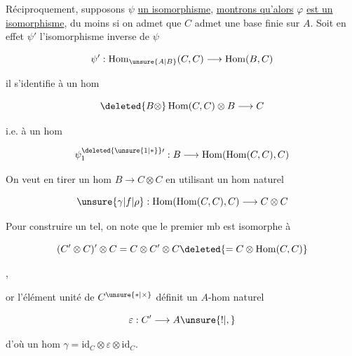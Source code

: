 

Réciproquement, supposons $\psi$ \uline{un isomorphisme}, \uline{montrons qu'alors} $\varphi$ \uline{est un isomorphisme}, du moins si on admet que $C$ admet une base finie sur $A$. Soit en effet $\psi'$ l'isomorphisme inverse de $\psi$

\[
\psi':\operatorname{Hom}_{\unsure{A|B}}(C,C)\longrightarrow\operatorname{Hom}(B,C)
\]

il s'identifie à un hom

\[
\deleted{B\otimes}\operatorname{Hom}(C,C)\otimes B\longrightarrow C
\]

i.e. à un hom

\[
\psi_1^{\deleted{\unsure{1|*}}\prime}:B\longrightarrow\operatorname{Hom}(\operatorname{Hom}(C,C),C)
\]

On veut en tirer un hom $B\to C\otimes C$ en utilisant un hom naturel

\[
\unsure{\gamma|f|\rho}:\operatorname{Hom}(\operatorname{Hom}(C,C),C)\longrightarrow C\otimes C
\]

Pour construire un tel, on note que le premier mb est isomorphe à

\[
(C'\otimes C)'\otimes C=C\otimes C'\otimes C\deleted{=C\otimes\operatorname{Hom}(C,C)}
\]

,

or l'élément unité de $C^{\unsure{*|\times}}$ définit un $A$-hom naturel

\[
\varepsilon:C'\longrightarrow A\unsure{!|,}
\]

d'où un hom $\gamma=\mathrm{id}_C\otimes\varepsilon\otimes\mathrm{id}_C$.
